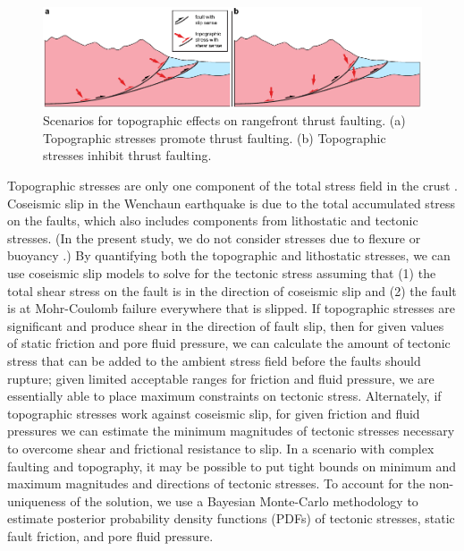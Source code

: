 \documentclass[twocolumn,jgrga]{AGUTeX}
\begin{document}
\begin{article}
\begin{figure}[t!]
\centering
\includegraphics[width=40pc]{../figures/topo_stress_possibilities.pdf}
\caption{Scenarios for topographic effects on rangefront thrust
faulting. (a) Topographic stresses promote thrust faulting. (b)
Topographic stresses inhibit thrust faulting.}
\label{fig:topo_fault_scenarios}
\end{figure}

Topographic stresses are only one component of the total stress field in
the crust \citep{molnar1988}. Coseismic slip in the Wenchaun earthquake
is due to the total accumulated stress on the faults, which also
includes components from lithostatic and tectonic stresses. (In the
present study, we do not consider stresses due to flexure \citep[e.g.,][]
{luttrell2007} or buoyancy \citep[e.g.,][]{luttrell2011}.) By quantifying
both the topographic and lithostatic stresses, we can use coseismic slip
models to solve for the tectonic stress assuming that (1) the total
shear stress on the fault is in the direction of coseismic slip \citep[e.g.,]
[]{angelier1994} and (2) the fault is at Mohr-Coulomb failure everywhere
that is slipped. If topographic stresses are significant and produce
shear in the direction of fault slip, then for given values of static
friction and pore fluid pressure, we can calculate the amount of
tectonic stress that can be added to the ambient stress field before the
faults should rupture; given limited acceptable ranges for friction and
fluid pressure, we are essentially able to place maximum constraints on
tectonic stress. Alternately, if topographic stresses work against
coseismic slip, for given friction and fluid pressures we can estimate
the minimum magnitudes of tectonic stresses necessary to overcome shear
and frictional resistance to slip. In a scenario with complex faulting
and topography, it may be possible to put tight bounds on minimum and
maximum magnitudes and directions of tectonic stresses. To account for
the non-uniqueness of the solution, we use a Bayesian Monte-Carlo
methodology to estimate posterior probability density functions (PDFs)
of tectonic stresses, static fault friction, and pore fluid pressure.


\end{article}
\end{document}
